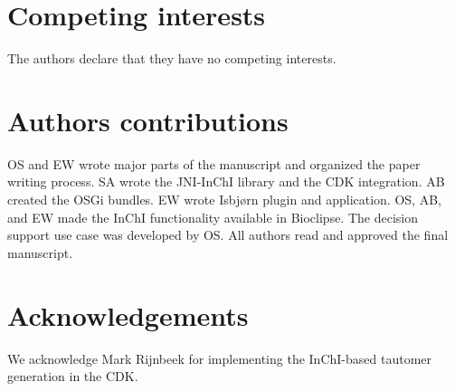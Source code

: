 \documentclass[10pt]{bmc_article}
\newenvironment{bmcformat}{\fussy\setboolean{publ}{true}}{\fussy}
\begin{document}
\begin{bmcformat}
\section*{Competing interests}
The authors declare that they have no competing interests.
    
\section*{Authors contributions}
OS and EW wrote major parts of the manuscript and organized the paper writing process. SA wrote the JNI-InChI library and
the CDK integration. AB created the OSGi bundles. EW wrote Isbjørn plugin and application. OS, AB, and EW made the InChI
functionality available in Bioclipse. The decision support use case was developed by OS.
All authors read and approved the final manuscript.
    

\section*{Acknowledgements}
We acknowledge Mark Rijnbeek for implementing the InChI-based tautomer
generation in the CDK.

 


{
   }     %




\end{bmcformat}
\end{document}
